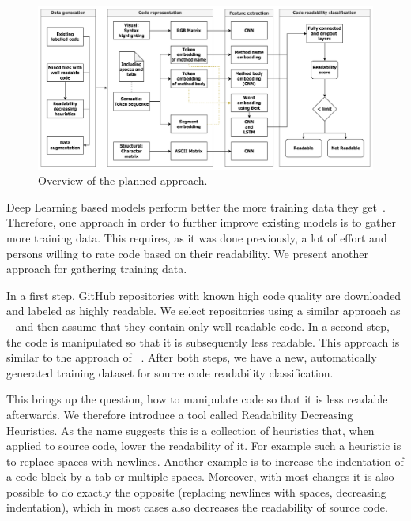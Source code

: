 \documentclass[%
class=scrreprt,
chapterprefix=false,%
open=right,%
twoside=false,%
paper=a4,%
logofile={Logo\_zentral\_farbig\_EN.png},%
thesistype=master,%
UKenglish,%
]{se2thesis}
\begin{document}
	\begin{figure}[t]
		\centering
		\includegraphics[width=\textwidth]{Model_pipeline.png}
		\caption{Overview of the planned approach.}
		\label{fig:model_pipeline}
	\end{figure}
	
	Deep Learning based models perform better the more training data they get~\cite{hestness2017deep}. Therefore, one approach in order to further improve existing models is to gather more training data.
	This requires, as it was done previously, a lot of effort and persons willing to rate code based on their readability. We present another approach for gathering training data.
	
	In a first step, GitHub repositories with known high code quality are downloaded and labeled as highly readable. We select repositories using a similar approach as \citeauthor{allamanis2016convolutional}~\cite{allamanis2016convolutional} and then assume that they contain only well readable code.
	In a second step, the code is manipulated so that it is subsequently less readable. This approach is similar to the approach of \citeauthor{loriot2022styler}~\cite{loriot2022styler}. After both steps, we have a new, automatically generated training dataset for source code readability classification.
		
	This brings up the question, how to manipulate code so that it is less readable afterwards. We therefore introduce a tool called Readability Decreasing Heuristics. As the name suggests this is a collection of heuristics that, when applied to source code, lower the readability of it. For example such a heuristic is to replace spaces with newlines. Another example is to increase the indentation of a code block by a tab or multiple spaces. Moreover, with most changes it is also possible to do exactly the opposite (replacing newlines with spaces, decreasing indentation), which in most cases also decreases the readability of source code.
	
\end{document}
